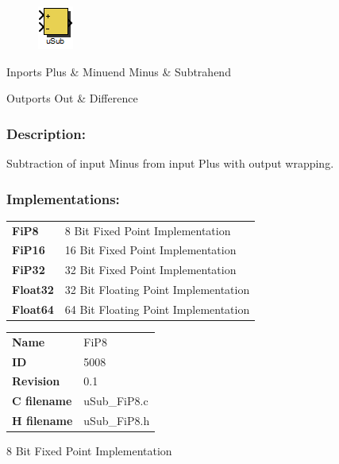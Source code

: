 \label{block:uSub}
\begin{figure}[H]\includegraphics{uSub}\end{figure} 

\begin{XtoCtabular}{Inports}
Plus & Minuend\tabularnewline
\hline
Minus & Subtrahend\tabularnewline
\hline
\end{XtoCtabular}


\begin{XtoCtabular}{Outports}
Out & Difference\tabularnewline
\hline
\end{XtoCtabular}

\subsubsection*{Description:}
Subtraction of input Minus from input Plus with output wrapping.


\subsubsection*{Implementations:}
\begin{tabular}{l l}
\textbf{FiP8} & 8 Bit Fixed Point Implementation\tabularnewline
\textbf{FiP16} & 16 Bit Fixed Point Implementation\tabularnewline
\textbf{FiP32} & 32 Bit Fixed Point Implementation\tabularnewline
\textbf{Float32} & 32 Bit Floating Point Implementation\tabularnewline
\textbf{Float64} & 64 Bit Floating Point Implementation\tabularnewline
\end{tabular}

\nopagebreak[0]
\begin{tabular}{l l}
\textbf{Name} & FiP8 \tabularnewline
\textbf{ID} & 5008 \tabularnewline
\textbf{Revision} & 0.1 \tabularnewline
\textbf{C filename} & uSub\_FiP8.c \tabularnewline
\textbf{H filename} & uSub\_FiP8.h \tabularnewline
\end{tabular}
\vspace{1ex}

8 Bit Fixed Point Implementation

